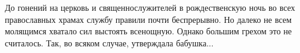 До гонений на церковь и священнослужителей в рождественскую ночь во всех
православных храмах службу правили почти беспрерывно. Но далеко не всем
молящимся  хватало сил выстоять всенощную. Однако большим грехом это не
считалось. Так, во всяком случае, утверждала бабушка...


